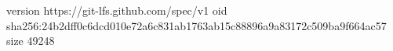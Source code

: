 version https://git-lfs.github.com/spec/v1
oid sha256:24b2dff0c6dcd010e72a6c831ab1763ab15c88896a9a83172c509ba9f664ac57
size 49248
